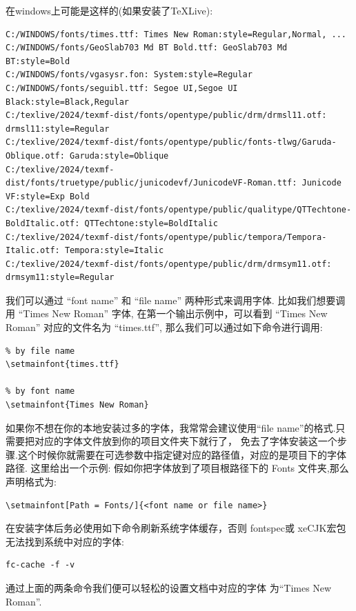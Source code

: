 在windows上可能是这样的(如果安装了\TeX{}Live):
\begin{verbatim}
C:/WINDOWS/fonts/times.ttf: Times New Roman:style=Regular,Normal, ...
C:/WINDOWS/fonts/GeoSlab703 Md BT Bold.ttf: GeoSlab703 Md BT:style=Bold
C:/WINDOWS/fonts/vgasysr.fon: System:style=Regular
C:/WINDOWS/fonts/seguibl.ttf: Segoe UI,Segoe UI Black:style=Black,Regular
C:/texlive/2024/texmf-dist/fonts/opentype/public/drm/drmsl11.otf: drmsl11:style=Regular
C:/texlive/2024/texmf-dist/fonts/opentype/public/fonts-tlwg/Garuda-Oblique.otf: Garuda:style=Oblique
C:/texlive/2024/texmf-dist/fonts/truetype/public/junicodevf/JunicodeVF-Roman.ttf: Junicode VF:style=Exp Bold
C:/texlive/2024/texmf-dist/fonts/opentype/public/qualitype/QTTechtone-BoldItalic.otf: QTTechtone:style=BoldItalic
C:/texlive/2024/texmf-dist/fonts/opentype/public/tempora/Tempora-Italic.otf: Tempora:style=Italic
C:/texlive/2024/texmf-dist/fonts/opentype/public/drm/drmsym11.otf: drmsym11:style=Regular
\end{verbatim}

我们可以通过 ``font name'' 和  ``file name'' 两种形式来调用字体. 比如我们想要调用 ``Times New Roman'' 字体,
在第一个输出示例中，可以看到 ``Times New Roman'' 对应的文件名为 ``times.ttf'', 那么我们可以通过如下命令进行调用:
\begin{verbatim}
% by file name 
\setmainfont{times.ttf}

% by font name
\setmainfont{Times New Roman}
\end{verbatim}

\begin{remark}
如果你不想在你的本地安装过多的字体，我常常会建议使用``file name''的格式.只需要把对应的字体文件放到你的项目文件夹下就行了，
免去了字体安装这一个步骤.这个时候你就需要在可选参数中指定键对应的路径值，对应的是项目下的字体路径. 这里给出一个示例:
假如你把字体放到了项目根路径下的 {Fonts} 文件夹,那么声明格式为:
\end{remark}
\begin{verbatim}
\setmainfont[Path = Fonts/]{<font name or file name>}
\end{verbatim}

在安装字体后务必使用如下命令刷新系统字体缓存，否则 {fontspec}或 {xeCJK}宏包无法找到系统中对应的字体:
\begin{verbatim}
fc-cache -f -v
\end{verbatim}

通过上面的两条命令我们便可以轻松的设置文档中对应的字体
为``Times New Roman''.

